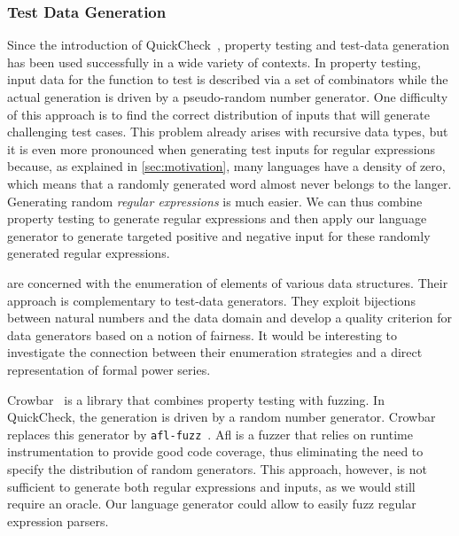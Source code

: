 \subsubsection*{Test Data Generation}

Since the introduction of
QuickCheck~\cite{DBLP:conf/icfp/ClaessenH00}, property testing and
test-data generation has been used successfully in a wide variety of
contexts.  In property testing, input data for the function to test is
described via a set of combinators while the actual generation is
driven by a pseudo-random number generator. One difficulty of this
approach is to find the correct distribution of inputs that will
generate challenging test cases. This problem already arises with
recursive data types, but it is even more pronounced when generating
test inputs for regular expressions because, as explained in
\cref{sec:motivation}, many languages have a density of zero, which
means that a randomly generated word almost never belongs to the
langer.  Generating random \emph{regular expressions} is much
easier. We can thus combine property testing to generate regular
expressions and then apply our language generator to generate targeted
positive and negative input for these randomly generated regular
expressions.

\citet{DBLP:journals/jfp/NewFFM17} are concerned with the enumeration
of elements of various data structures. Their approach is
complementary to test-data generators. They exploit bijections between
natural numbers and the data domain and develop a quality criterion
for data generators based on a notion of fairness. It would be
interesting to investigate the connection between their enumeration
strategies and a direct representation of formal power series.

Crowbar~\cite{crowbar} is a library that combines property testing
with fuzzing.  In QuickCheck, the generation is driven by a random
number generator. Crowbar replaces this generator by
\texttt{afl-fuzz}~\cite{afl}. Afl is a fuzzer that relies on runtime
instrumentation to provide good code coverage, thus eliminating the
need to specify the distribution of random generators.  This approach,
however, is not sufficient to generate both regular expressions and
inputs, as we would still require an oracle. Our language generator
could allow to easily fuzz regular expression parsers.



